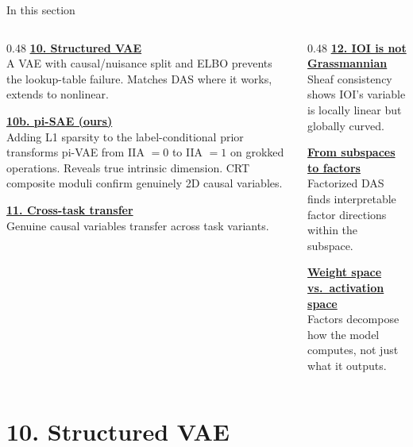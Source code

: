 \documentclass[aspectratio=169,11pt]{beamer}
\begin{document}
\begin{frame}{In this section}
\begin{columns}[T]
\begin{column}{0.48\textwidth}
\textbf{\hyperlink{sec10}{10. Structured VAE}}\\[0.2em]
{\small A VAE with causal/nuisance split and ELBO prevents the lookup-table failure. Matches DAS where it works, extends to nonlinear.}

\vspace{0.4em}
\textbf{\hyperlink{sec10b}{10b. pi-SAE (ours)}}\\[0.2em]
{\small Adding L1 sparsity to the label-conditional prior transforms pi-VAE from IIA $= 0$ to IIA $= 1$ on grokked operations. Reveals true intrinsic dimension. CRT composite moduli confirm genuinely 2D causal variables.}

\vspace{0.4em}
\textbf{\hyperlink{sec11}{11. Cross-task transfer}}\\[0.2em]
{\small Genuine causal variables transfer across task variants.}
\end{column}
\begin{column}{0.48\textwidth}
\textbf{\hyperlink{sec12}{12. IOI is not Grassmannian}}\\[0.2em]
{\small Sheaf consistency shows IOI's variable is locally linear but globally curved.}

\vspace{0.4em}
\textbf{\hyperlink{sec12b}{From subspaces to factors}}\\[0.2em]
{\small Factorized DAS finds interpretable factor directions within the subspace.}

\vspace{0.4em}
\textbf{\hyperlink{sec12c}{Weight space vs.\ activation space}}\\[0.2em]
{\small Factors decompose how the model computes, not just what it outputs.}
\end{column}
\end{columns}
\end{frame}

\hypertarget{sec10}{}
\section{10. Structured VAE}
\end{document}
